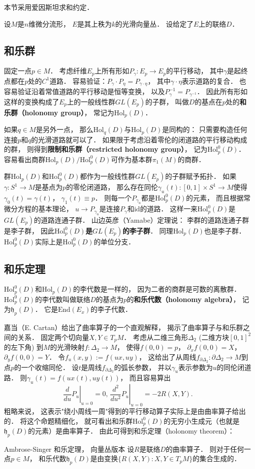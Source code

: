 

本节采用爱因斯坦求和约定．

设$M$是$n$维微分流形， $E$是其上秩为$k$的光滑向量丛． 设给定了$E$上的联络$D$．

\subsection{和乐群}
固定一点$p\in M$． 考虑纤维$E_p$上所有形如$P_\gamma:E_p\to E_p$的平行移动， 其中$\gamma$是起终点都在$p$处的$C^1$道路． 容易验证：$P_\gamma\cdot P_\eta=P_{\gamma\cdot\eta}$，
其中$\gamma\cdot\eta$表示道路的复合． 也容易验证沿着常值道路的平行移动是恒等变换， 以及$P_\gamma^{-1}=P_{\gamma^{-1}}$． 因此所有形如这样的变换构成了$E_p$上的一般线性群$GL(E_p)$的子群， 叫做$D$的基点在$p$处的\textbf{和乐群（holonomy group）}， 常记为$\text{Hol}_p(D)$． 

如果$q\in M$是另外一点， 那么$\text{Hol}_q(D)$与$\text{Hol}_p(D)$是同构的： 只需要构造任何连接$p$和$q$的光滑道路就可以了． 如果限于考虑沿着零伦的闭道路的平行移动构成的群， 则得到\textbf{限制和乐群（restricted holonomy group）}， 记为$\text{Hol}^0_p(D)$． 容易看出商群$\text{Hol}_p(D)/\text{Hol}_p^0(D)$可作为基本群$\pi_1(M)$的商群．

群$\text{Hol}_p(D)$和$\text{Hol}_p^0(D)$都作为一般线性群$GL(E_p)$的子群赋予拓扑． 如果$\gamma:S^1\to M$是基点为$p$的零伦闭道路， 那么存在同伦$\gamma_u(t):[0,1]\times S^1\to M$使得$\gamma_0(t)=\gamma(t)$， $\gamma_1(t)\equiv p$． 则每一个$P_{\gamma_u}$都是$\text{Hol}_p^0(D)$的元素， 而且根据常微分方程的基本理论， $u\to P_{\gamma_u}$是连接$P_\gamma$和$\text{id}$的道路． 这样一来$\text{Hol}_p^0(D)$是$GL(E_p)$的道路连通子群． 山边英彦（Yamabe）定理说： 李群的道路连通子群是李子群， 因此\textbf{$\text{Hol}_p^0(D)$是$GL(E_p)$的李子群}． 同理$\text{Hol}_p(D)$也是李子群． $\text{Hol}_p^0(D)$实际上是$\text{Hol}_p^0(D)$的单位分支．

\subsection{和乐定理}
$\text{Hol}_p^0(D)$和$\text{Hol}_p(D)$的李代数是一样的， 因为二者的商群是可数的离散群． $\text{Hol}_p^0(D)$的李代数叫做联络$D$的基点为$p$的\textbf{和乐代数（holonomy algebra）}， 记为$\mathfrak{h}_p(D)$．  它是$\text{End}(E_x)$的李子代数． 

嘉当（E. Cartan）给出了曲率算子的一个直观解释， 揭示了曲率算子与和乐群之间的关系． 固定两个切向量$X,Y\in T_pM$． 考虑从二维三角形$\Delta_2$ (二维方块$[0,1]^2$的左下角) 到$M$的光滑映射$f:\Delta_2\to M$， 使得$f(0,0)=p$， $\partial_xf(0,0)=X$， $\partial_yf(0,0)=Y$． 令$f_u(x,y):=f(ux,uy)$， 这给出了从周线$f_{\partial\Delta_2}:\partial\Delta_2\to M$到点$p$的一个收缩同伦． 设$t$是周线$f_{\partial\Delta_2}$的弧长参数， 并以$\gamma_u$表示参数为$u$的同伦闭道路． 则$\gamma_u(t)=f(ux(t),uy(t))$， 而且容易算出
$$
\left.\frac{d}{du}P_u\right|_{u=0}=0,\,\left.\frac{d^2}{du^2}P_u\right|_{u=0}=-2R(X,Y).
$$
粗略来说， 这表示"绕小周线一周"得到的平行移动算子实际上是由曲率算子给出的． 将这个命题精细化， 就可看出和乐群$\text{Hol}_p^0(D)$的无穷小生成元（也就是$\mathfrak{h}_p(D)$的元素）是曲率算子． 由此可得到和乐定理（holonomy theorem）：

\begin{theorem}{Ambrose-Singer 和乐定理， 向量丛版本}
设$R$是联络$D$的曲率算子． 则对于任何一点$p\in M$， 和乐代数$\mathfrak{h}_p(D)$是由变换$\{R(X,Y):X,Y\in T_pM\}$的集合生成的．
\end{theorem}
